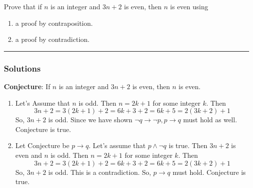\newpage
\begin{question}
Prove that if $n$ is an integer and $3n+2$ is even, then $n$ is
even using
\begin{enumerate}
\item a proof by contraposition.
\item a proof by contradiction.
\end{enumerate}
\end{question}  

\par\noindent\rule{\textwidth}{0.5pt}

\subsubsection*{Solutions}
\textbf{Conjecture}: If $n$ is an integer and $3n+2$ is even, then $n$ is even.
\begin{enumerate}
    \item Let's Assume that $n$ is odd. Then $n = 2k+1$ for some integer $k$. Then $$3n+2 = 3(2k+1)+2 = 6k+3+2 = 6k+5 = 2(3k+2)+1$$So, $3n+2$ is odd. Since we have shown $\neg q \rightarrow \neg p, p \rightarrow q$ must hold as well. Conjecture is true.

    \item Let Conjecture be $p \rightarrow q$. Let's assume that $p \wedge \neg q$ is true. Then $3n+2$ is even and $n$ is odd. Then $n = 2k+1$ for some integer $k$. Then $$3n+2 = 3(2k+1)+2 = 6k+3+2 = 6k+5 = 2(3k+2)+1$$So, $3n+2$ is odd. This is a contradiction. So, $p \rightarrow q$ must hold. Conjecture is true.
\end{enumerate}